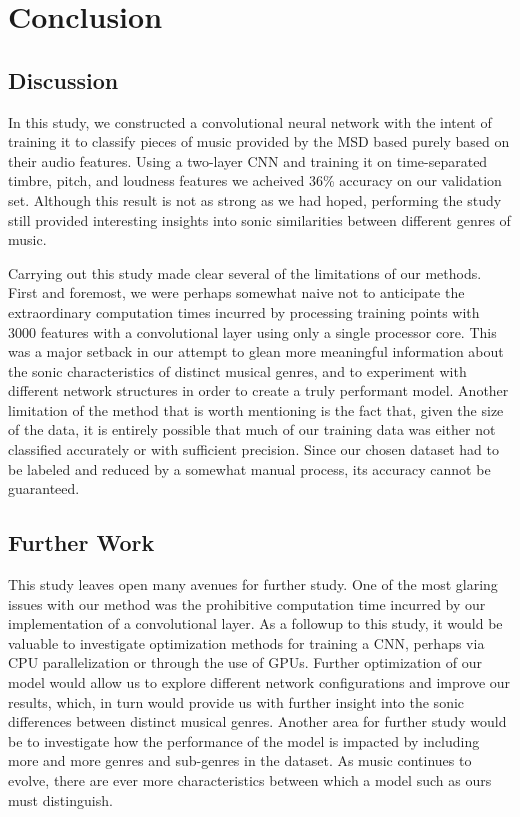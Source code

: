 \documentclass{article} %
\begin{document}
\section{Conclusion}
\subsection{Discussion}
In this study, we constructed a convolutional neural network with the intent of training it to classify pieces of music provided by the MSD based purely based on their audio features. Using a two-layer CNN and training it on time-separated timbre, pitch, and loudness features we acheived 36\% accuracy on our validation set. Although this result is not as strong as we had hoped, performing the study still provided interesting insights into sonic similarities between different genres of music.
\par Carrying out this study made clear several of the limitations of our methods. First and foremost, we were perhaps somewhat naive not to anticipate the extraordinary computation times incurred by processing training points with 3000 features with a convolutional layer using only a single processor core. This was a major setback in our attempt to glean more meaningful information about the sonic characteristics of distinct musical genres, and to experiment with different network structures in order to create a truly performant model. Another limitation of the method that is worth mentioning is the fact that, given the size of the data, it is entirely possible that much of our training data was either not classified accurately or with sufficient precision. Since our chosen dataset had to be labeled and reduced by a somewhat manual process, its accuracy cannot be guaranteed.

\subsection{Further Work}
This study leaves open many avenues for further study. One of the most glaring issues with our method was the prohibitive computation time incurred by our implementation of a convolutional layer. As a followup to this study, it would be valuable to investigate optimization methods for training a CNN, perhaps via CPU parallelization or through the use of GPUs. Further optimization of our model would allow us to explore different network configurations and improve our results, which, in turn would provide us with further insight into the sonic differences between distinct musical genres. Another area for further study would be to investigate how the performance of the model is impacted by including more and more genres and sub-genres in the dataset. As music continues to evolve, there are ever more characteristics between which a model such as ours must distinguish.
\end{document}
